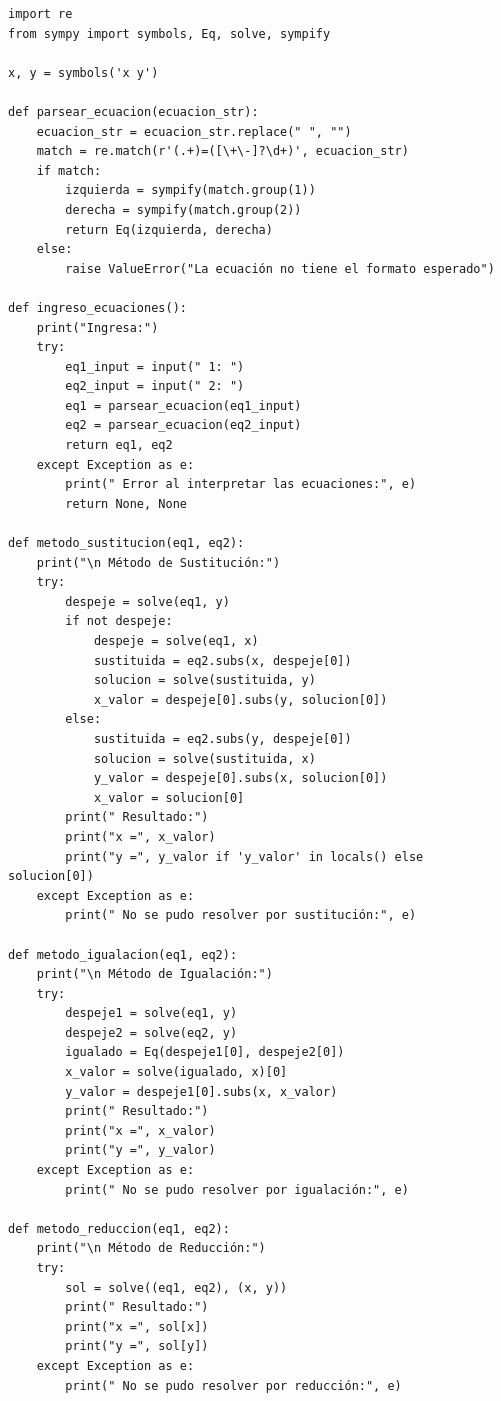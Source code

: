 \documentclass[a4paper,10pt]{article}
\begin{document}
\begin{lstlisting}
import re                                                                                       
from sympy import symbols, Eq, solve, sympify

x, y = symbols('x y')

def parsear_ecuacion(ecuacion_str):
    ecuacion_str = ecuacion_str.replace(" ", "")
    match = re.match(r'(.+)=([\+\-]?\d+)', ecuacion_str)
    if match:
        izquierda = sympify(match.group(1))
        derecha = sympify(match.group(2))
        return Eq(izquierda, derecha)
    else:
        raise ValueError("La ecuación no tiene el formato esperado")

def ingreso_ecuaciones():
    print("Ingresa:")
    try:
        eq1_input = input(" 1: ")
        eq2_input = input(" 2: ")
        eq1 = parsear_ecuacion(eq1_input)
        eq2 = parsear_ecuacion(eq2_input)
        return eq1, eq2
    except Exception as e:
        print(" Error al interpretar las ecuaciones:", e)
        return None, None

def metodo_sustitucion(eq1, eq2):
    print("\n Método de Sustitución:")
    try:
        despeje = solve(eq1, y)
        if not despeje:
            despeje = solve(eq1, x)
            sustituida = eq2.subs(x, despeje[0])
            solucion = solve(sustituida, y)
            x_valor = despeje[0].subs(y, solucion[0])
        else:
            sustituida = eq2.subs(y, despeje[0])
            solucion = solve(sustituida, x)
            y_valor = despeje[0].subs(x, solucion[0])
            x_valor = solucion[0]
        print(" Resultado:")
        print("x =", x_valor)
        print("y =", y_valor if 'y_valor' in locals() else solucion[0])
    except Exception as e:
        print(" No se pudo resolver por sustitución:", e)

def metodo_igualacion(eq1, eq2):
    print("\n Método de Igualación:")
    try:
        despeje1 = solve(eq1, y)
        despeje2 = solve(eq2, y)
        igualado = Eq(despeje1[0], despeje2[0])
        x_valor = solve(igualado, x)[0]
        y_valor = despeje1[0].subs(x, x_valor)
        print(" Resultado:")
        print("x =", x_valor)
        print("y =", y_valor)
    except Exception as e:
        print(" No se pudo resolver por igualación:", e)

def metodo_reduccion(eq1, eq2):
    print("\n Método de Reducción:")
    try:
        sol = solve((eq1, eq2), (x, y))
        print(" Resultado:")
        print("x =", sol[x])
        print("y =", sol[y])
    except Exception as e:
        print(" No se pudo resolver por reducción:", e)


\end{lstlisting}
\end{document}
